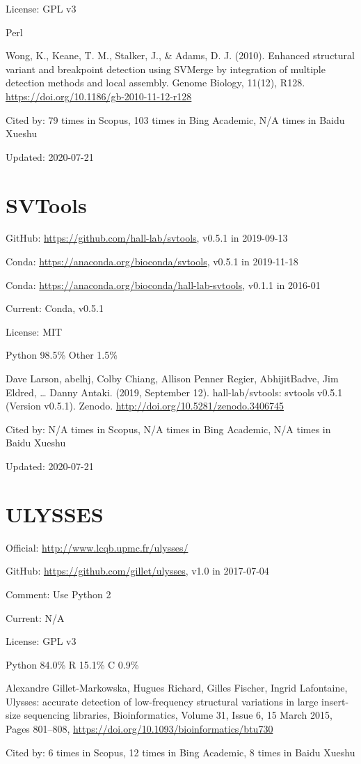 \documentclass[]{article}
\newcommand{\cb}[3]{\par Cited by: {\color{blue}\Huge #1} times in Scopus, {\color{blue}\Huge #2} times in Bing Academic, {\color{blue}\Huge #3} times in Baidu Xueshu}
\begin{document}
License: GPL v3

Perl

Wong, K., Keane, T. M., Stalker, J., \& Adams, D. J. (2010). Enhanced structural variant and breakpoint detection using SVMerge by integration of multiple detection methods and local assembly. Genome Biology, 11(12), R128. \url{https://doi.org/10.1186/gb-2010-11-12-r128}\cb{79}{103}{N/A}

Updated: 2020-07-21

\section{SVTools}

GitHub: \url{https://github.com/hall-lab/svtools}, v0.5.1 in 2019-09-13

Conda: \url{https://anaconda.org/bioconda/svtools}, v0.5.1 in 2019-11-18

Conda: \url{https://anaconda.org/bioconda/hall-lab-svtools}, v0.1.1 in 2016-01

Current: Conda, v0.5.1

License: MIT

Python 98.5\% Other 1.5\%

Dave Larson, abelhj, Colby Chiang, Allison Penner Regier, AbhijitBadve, Jim Eldred, … Danny Antaki. (2019, September 12). hall-lab/svtools: svtools v0.5.1 (Version v0.5.1). Zenodo. \url{http://doi.org/10.5281/zenodo.3406745}\cb{N/A}{N/A}{N/A}

Updated: 2020-07-21

\section{ULYSSES}

Official: \url{http://www.lcqb.upmc.fr/ulysses/}

GitHub: \url{https://github.com/gillet/ulysses}, v1.0 in 2017-07-04

Comment: Use Python 2

Current: N/A

License: GPL v3

Python 84.0\% R 15.1\% C 0.9\%

Alexandre Gillet-Markowska, Hugues Richard, Gilles Fischer, Ingrid Lafontaine, Ulysses: accurate detection of low-frequency structural variations in large insert-size sequencing libraries, Bioinformatics, Volume 31, Issue 6, 15 March 2015, Pages 801–808, \url{https://doi.org/10.1093/bioinformatics/btu730}\cb{6}{12}{8}
\end{document}
